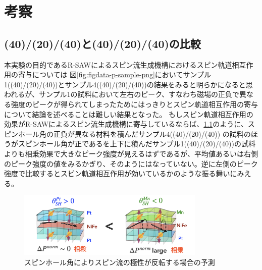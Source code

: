 \documentclass[dvipdfmx,11pt]{jsreport}
\numberwithin{equation}{chapter}
\numberwithin{table}{chapter}
\begin{document}
\chapter{考察}
\section{(40)/(20)/(40)と(40)/(20)/(40)の比較}
本実験の目的であるR-SAWによるスピン流生成機構におけるスピン軌道相互作用の寄与については
図\ref{fig:figdata-p-sample-png}においてサンプル1((40)/(20)/(40))とサンプル4((40)/(20)/(40))の結果をみると明らかになると思われるが、サンプル1の試料において左右のピーク、すなわち磁場の正負で異なる強度のピークが得られてしまったためにはっきりとスピン軌道相互作用の寄与について結論を述べることは難しい結果となった。
もしスピン軌道相互作用の効果がR-SAWによるスピン流生成機構に寄与しているならば、\ref{fig:efig-e2-png}のように、スピンホール角の正負が異なる材料を積んだサンプル4((40)/(20)/(40))  の試料のほうがスピンホール角が正であるを上下に積んだサンプル1((40)/(20)/(40))の試料よりも相乗効果で大きなピーク強度が見えるはずであるが、平均値あるいは右側のピーク強度の値をみるかぎり、そのようにはなっていない。逆に左側のピーク強度で比較するとスピン軌道相互作用が効いているかのような振る舞いにみえる。

\begin{figure}[H]
	\centering
	\includegraphics[width=0.8\textwidth]{efig/e2.png}
	\caption{スピンホール角によりスピン流の極性が反転する場合の予測}
	\label{fig:efig-e2-png}
\end{figure}
\end{document}
